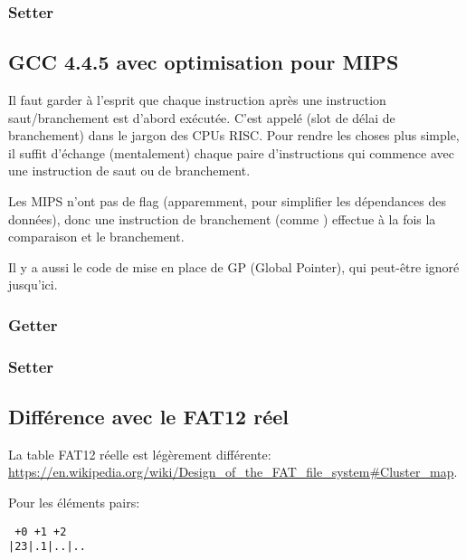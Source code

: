 \subsubsection{Setter}



\subsection{GCC 4.4.5 avec optimisation pour MIPS}

Il faut garder à l'esprit que chaque instruction après une instruction
saut/branchement est d'abord exécutée.
C'est appelé  (slot de délai de branchement) dans le jargon
des CPUs RISC.
Pour rendre les choses plus simple, il suffit d'échange (mentalement) chaque paire
d'instructions qui commence avec une instruction de saut ou de branchement.

Les MIPS n'ont pas de flag (apparemment, pour simplifier les dépendances des données),
donc une instruction de branchement (comme ) effectue à la fois la comparaison
et le branchement.

Il y a aussi le code de mise en place de GP (Global Pointer), qui peut-être ignoré
jusqu'ici.

\subsubsection{Getter}



\subsubsection{Setter}



\subsection{Différence avec le FAT12 réel}

La table FAT12 réelle est légèrement différente: \url{https://en.wikipedia.org/wiki/Design_of_the_FAT_file_system\#Cluster_map}.

Pour les éléments pairs:

\begin{lstlisting}
 +0 +1 +2
|23|.1|..|..
\end{lstlisting}

